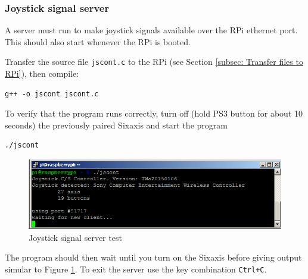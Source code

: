 \subsubsection{Joystick signal server}
A server must run to make joystick signals available over the RPi ethernet port. This should also start whenever the RPi is booted.

Transfer the source file \texttt{jscont.c} to the RPi (see Section
\ref{subsec: Transfer files to RPi}), then compile:

\begin{verbatim}g++ -o jscont jscont.c\end{verbatim}

To verify that the program runs correctly, turn off (hold PS3 button
for about 10 seconds) the previously paired Sixaxis and start the
program

\begin{verbatim}./jscont\end{verbatim}

\begin{figure}[h!]
	\centering \includegraphics[scale=0.45]{fig/RPi_jscont} \caption{Joystick signal server test}
	\label{fig: RPi joystick server} 
\end{figure}

The program should then wait until you turn on the Sixaxis before
giving output simular to Figure \ref{fig: RPi joystick server}. To
exit the server use the key combination \texttt{Ctrl+C}.

